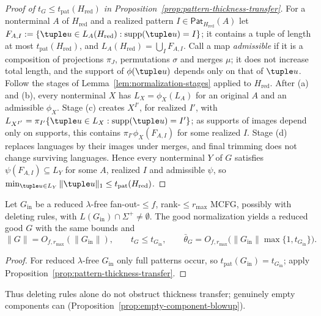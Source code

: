 \begin{proof}[Proof of $t_G\le t_{\mathrm{pat}}(H_{\mathrm{red}})$ in
Proposition~\ref{prop:pattern-thickness-transfer}]
For a nonterminal $A$ of $H_{\mathrm{red}}$ and a realized pattern
$I\in\mathsf{Pat}_{H_{\mathrm{red}}}(A)$
let $F_{A,I}:=\{\tuple u\in L_A(H_{\mathrm{red}}):\operatorname{supp}(\tuple u)=I\}$; it
contains a tuple of length at most $t_{\mathrm{pat}}(H_{\mathrm{red}})$, and
$L_A(H_{\mathrm{red}})=\bigcup_IF_{A,I}$.  Call a map \emph{admissible} if it is a composition of
projections $\pi_J$, permutations $\sigma$ and merges $\mu$; it does not increase total
length, and the support of $\phi(\tuple u)$ depends only on that of $\tuple u$.  Follow
the stages of Lemma~\ref{lem:normalization-stages} applied to $H_{\mathrm{red}}$.
After (a) and (b), every nonterminal $X$ has $L_X=\phi_X(L_A)$ for an original $A$ and
an admissible $\phi_X$.  Stage (c) creates $X^{I'}$, for realized $I'$, with
$L_{X^{I'}}=\pi_{I'}\{\tuple u\in L_X:\operatorname{supp}(\tuple u)=I'\}$; as supports of
images depend only on supports, this contains $\pi_{I'}\phi_X(F_{A,I})$ for some realized
$I$.  Stage (d) replaces languages by their images under merges, and final trimming does
not change surviving languages.  Hence every nonterminal $Y$ of $G$ satisfies
$\psi(F_{A,I})\subseteq L_Y$ for some $A$, realized $I$ and admissible $\psi$, so
$\min_{\tuple u\in L_Y}\|\tuple u\|_1\le t_{\mathrm{pat}}(H_{\mathrm{red}})$.
\end{proof}

\begin{proposition}
\label{prop:structural-good-thickness}
Let $G_{\mathrm{in}}$ be a reduced $\lambda$-free fan-out-$\le f$, rank-$\le r_{\max}$
MCFG, possibly with deleting rules, with $L(G_{\mathrm{in}})\cap\Sigma^+\ne\emptyset$.
The good normalization yields a reduced good $G$ with the same bounds and
\[
  \|G\|=O_{f,r_{\max}}(\|G_{\mathrm{in}}\|),\qquad
  t_G\le t_{G_{\mathrm{in}}},\qquad
  \bar\theta_G=O_{f,r_{\max}}\bigl(\|G_{\mathrm{in}}\|\max\{1,t_{G_{\mathrm{in}}}\}\bigr).
\]
\end{proposition}

\begin{proof}
For reduced $\lambda$-free $G_{\mathrm{in}}$ only full patterns occur, so
$t_{\mathrm{pat}}(G_{\mathrm{in}})=t_{G_{\mathrm{in}}}$; apply
Proposition~\ref{prop:pattern-thickness-transfer}.
\end{proof}

Thus deleting rules alone do not obstruct thickness transfer; genuinely empty
components can (Proposition~\ref{prop:empty-component-blowup}).


